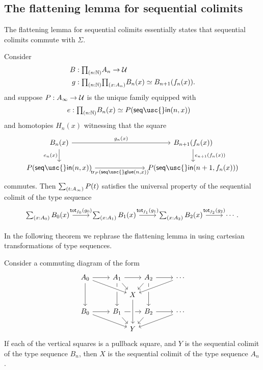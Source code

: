 \subsection{The flattening lemma for sequential colimits}

The flattening lemma for sequential colimits essentially states that sequential colimits commute with $\Sigma$. 

\begin{lem}
Consider
\begin{align*}
B & : \prd{n:\N}A_n\to\UU \\
g & : \prd{n:\N}{x:A_n}\eqv{B_n(x)}{B_{n+1}(f_n(x))}.
\end{align*}
and suppose $P:A_\infty\to\mathcal{U}$ is the unique family equipped with
\begin{align*}
e & : \prd{n:\N}\eqv{B_n(x)}{P(\mathsf{seq\usc{}in}(n,x))}
\end{align*}
and homotopies $H_n(x)$ witnessing that the square
\begin{equation*}
\begin{tikzcd}[column sep=7em]
B_n(x) \arrow[r,"g_n(x)"] \arrow[d,swap,"e_n(x)"] & B_{n+1}(f_n(x)) \arrow[d,"e_{n+1}(f_n(x))"] \\
P(\mathsf{seq\usc{}in}(n,x)) \arrow[r,swap,"{\mathsf{tr}_P(\mathsf{seq\usc{}glue}(n,x))}"] & P(\mathsf{seq\usc{}in}(n+1,f_n(x)))
\end{tikzcd}
\end{equation*}
commutes. Then $\sm{t:A_\infty}P(t)$ satisfies the universal property of the sequential colimit of the type sequence
\begin{equation*}
\begin{tikzcd}
\sm{x:A_0}B_0(x) \arrow[r,"{\total[f_0]{g_0}}"] & \sm{x:A_1}B_1(x) \arrow[r,"{\total[f_1]{g_1}}"] & \sm{x:A_2}B_2(x) \arrow[r,"{\total[f_2]{g_2}}"] & \cdots.
\end{tikzcd}
\end{equation*}
\end{lem}

In the following theorem we rephrase the flattening lemma in using cartesian transformations of type sequences.

\begin{thm}
Consider a commuting diagram of the form
\begin{equation*}
\begin{tikzcd}[column sep=small,row sep=small]
A_0 \arrow[rr] \arrow[dd] & & A_1 \arrow[rr] \arrow[dr] \arrow[dd] &[-.9em] &[-.9em] A_2 \arrow[dl] \arrow[dd] & & \cdots \\
& & & X \arrow[from=ulll,crossing over] \arrow[from=urrr,crossing over] \arrow[from=ur,to=urrr] \\
B_0 \arrow[rr] \arrow[drrr] & & B_1 \arrow[rr] \arrow[dr] & & B_2 \arrow[rr] \arrow[dl] & & \cdots \arrow[dlll] \\
& & & Y \arrow[from=uu,crossing over] 
\end{tikzcd}
\end{equation*}
If each of the vertical squares is a pullback square, and $Y$ is the sequential colimit of the type sequence $B_n$, then $X$ is the sequential colimit of the type sequence $A_n$. 
\end{thm}

